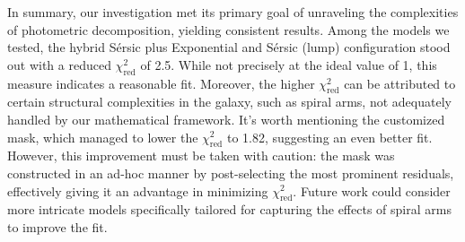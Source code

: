


In summary, our investigation met its primary goal of unraveling the complexities of photometric decomposition, yielding consistent results. Among the models we tested, the hybrid S\'{e}rsic plus Exponential and S\'{e}rsic (lump) configuration stood out with a reduced \( \chi_{\text{red}}^{2} \) of 2.5. While not precisely at the ideal value of 1, this measure indicates a reasonable fit. Moreover, the higher \( \chi_{\text{red}}^{2} \) can be attributed to certain structural complexities in the galaxy, such as spiral arms, not adequately handled by our mathematical framework. It's worth mentioning the customized mask, which managed to lower the \( \chi_{\text{red}}^{2} \) to 1.82, suggesting an even better fit. However, this improvement must be taken with caution: the mask was constructed in an ad-hoc manner by post-selecting the most prominent residuals, effectively giving it an advantage in minimizing \( \chi_{\text{red}}^{2} \). Future work could consider more intricate models specifically tailored for capturing the effects of spiral arms to improve the fit.


